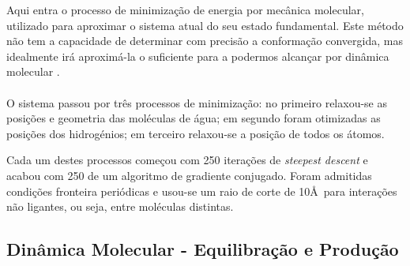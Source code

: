 \documentclass[12pt,a4paper]{article}
\begin{document}
	Aqui entra o processo de minimização de energia por mecânica molecular, utilizado para aproximar o sistema atual do seu estado fundamental. Este método não tem a capacidade de determinar com precisão a conformação convergida, mas idealmente irá aproximá-la o suficiente para a podermos alcançar por dinâmica molecular \cite{cheathamMolecularModelingNucleic2001,galindo-murilloMolecularModelingNucleic2014}.\paragraph{}
	
	O sistema passou por três processos de minimização: no primeiro relaxou-se as posições e geometria das moléculas de água; em segundo foram otimizadas as posições dos hidrogénios; em terceiro relaxou-se a posição de todos os átomos.
	
	Cada um destes processos começou com 250 iterações de \textit{steepest descent} e acabou com 250 de um algoritmo de gradiente conjugado. Foram admitidas condições fronteira periódicas e usou-se um raio de corte de 10\AA \ para interações não ligantes, ou seja, entre moléculas distintas.
	
\subsection{Dinâmica Molecular - Equilibração e Produção}
	
	
\end{document}
